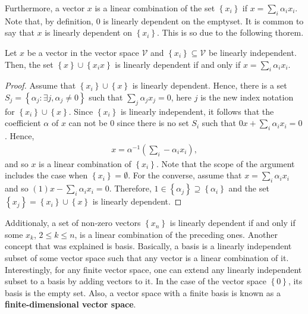 \documentclass[12pt]{article}
\newenvironment{theorem}[2][Theorem]{\begin{trivlist} \item[\hskip \labelsep {\bfseries #1}\hskip \labelsep {\bfseries #2.}]}{\end{trivlist}}
\begin{document}
Furthermore, a vector $x$ is a linear combination of the set $\left\{ x_{i} \right\}$ if $x = \sum_{i}\alpha_{i}x_{i}$. Note that, by definition, $0$ is linearly dependent on the emptyset. It is common to say that $x$ is linearly dependent on $\left\{ x_{i} \right\}$. This is so due to the following thorem. 
\begin{theorem}{1}
  Let $x$ be a vector in the vector space $\mathcal{V}$ and $\left\{ x_{i} \right\}\subseteq \mathcal{V}$ be linearly independent. Then, the set $\left\{ x \right\}\cup\left\{ x_{i}x \right\}$ is linearly dependent if and only if $x=\sum_{i}\alpha_{i}x_{i}$.
\begin{proof}
  Assume that $\left\{ x_{i} \right\}\cup \left\{ x \right\}$ is linearly dependent. Hence, there is a set $S_{j} = \left\{ \alpha_{j}:\exists j,\alpha_{j}\neq 0 \right\}$ such that $\sum_{j} \alpha_{j} x_{j} = 0$, here $j$ is the new index notation for $\left\{ x_{i} \right\}\cup \left\{ x \right\}$. Since $\left\{ x_{i} \right\}$ is linearly independent, it follows that the coefficient $\alpha$ of $x$ can not be 0 since there is no set $S_{i}$ such that $0x + \sum_{i}\alpha_{i}x_{i} = 0$. Hence, 
\begin{align*}
  x = \alpha^{-1} \left(\sum_{i}-\alpha_{i}x_{i}\right),
\end{align*}
and so $x$ is a linear combination of $\left\{ x_{i} \right\}$. Note that the scope of the argument includes the case when $\left\{ x_{i} \right\}=\emptyset$. For the converse, assume that $x = \sum_{i}\alpha_{i}x_{i}$ and so $(1)x-\sum_{i}\alpha_{i}x_{i} = 0$. Therefore, $1\in \left\{ \alpha_{j} \right\} \supseteq \left\{ \alpha_{i} \right\}$ and the set $\left\{ x_{j} \right\} = \left\{ x_{i} \right\}\cup \left\{ x \right\}$ is linearly dependent. 
\end{proof}
\end{theorem}
Additionaly, a set of non-zero vectors $\left\{ x_{n} \right\}$ is linearly dependent if and only if some $x_{k}$, $2\leq k \leq n$, is a linear combination of the preceding ones.
Another concept that was explained is basis. Basically, a basis is a linearly independent subset of some vector space such that any vector is a linear combination of it. Interestingly, for any finite vector space, one can extend any linearly independent subset to a basis by adding vectors to it. In the case of the vector space $\left\{ 0 \right\}$, its basis is the empty set. Also, a vector space with a finite basis is known as a \textbf{finite-dimensional vector space}. 
\end{document}
